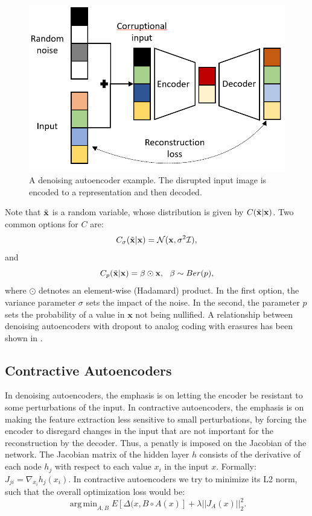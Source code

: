 \documentclass[graybox]{svmult}
\DeclareMathOperator{\argmin}{arg\,min}
\newcommand{\mb}[1]{\mathbf{#1}}
\newcommand{\bx}[0]{\mb{x}}
\begin{document}
\begin{figure}
    \centering
    \includegraphics[scale=0.8]{dae.png}
    \caption{A denoising autoencoder example. The disrupted input image is encoded to a representation and then decoded.}
    \label{fig:Denoised_Autoencoder}
\end{figure}

Note that $\Tilde{\bx}$ is a random variable, whose distribution is given by $C(\Tilde{\bx}|\bx)$. Two common options for $C$ are:
\begin{equation}
C_\sigma(\Tilde{\bx}|\bx) = \mathcal{N}(\bx,\sigma^2 \mathcal{I}),
\end{equation}
and
\begin{equation}
C_p(\Tilde{\bx}|\bx) = \beta \odot \bx, ~~ \beta\sim Ber(p),
\end{equation}
where $\odot$ detnotes an element-wise (Hadamard) product.
In the first option, the variance parameter $\sigma$  sets the impact of the noise. In the second, the parameter $p$ sets the probability of a value in $\bx$ not being nullified.
A relationship between denoising autoencoders with dropout to analog coding with erasures has been shown in \cite{denoising_ae_and_ETF}.


\subsection{Contractive Autoencoders}
\label{sec:contractive_autoencoders}
In denoising autoencoders, the emphasis is on letting the encoder be resistant to some perturbations of the input. In contractive autoencoders, the emphasis is on making the feature extraction less sensitive to small perturbations, by forcing the encoder to disregard changes in the input that are not important for the reconstruction by the decoder.
Thus, a penatly is imposed on the Jacobian of the network. 
The Jacobian matrix of the hidden layer $h$ consists of the derivative of each node $h_j$ with respect to each value $x_i$ in the input $x$. Formally: $J_{ji}=\nabla_{x_i}h_j(x_i)$. In contractive autoencoders we try to minimize its L2 norm, such that the overall optimization loss would be:
\begin{equation}
\argmin_{A,B}E[\Delta(x, B\circ A (x)]+\lambda||J_A(x)||^2_2.
\end{equation}
\end{document}
